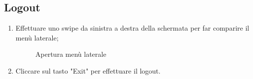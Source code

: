 \subsection{Logout}
\begin{enumerate}
\item Effettuare uno swipe da sinistra a destra della schermata per far comparire il menù laterale; 
\begin{figure}[!ht]
	\centering
	\caption{Apertura menù laterale}
\end{figure}
\item Cliccare sul tasto "Exit" per effettuare il logout.
\begin{figure}[!ht]

\end{figure}
\end{enumerate}
